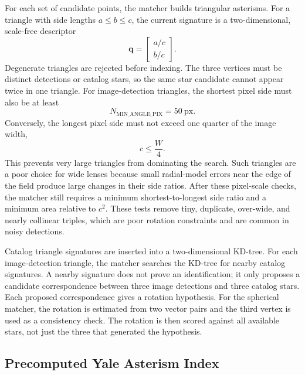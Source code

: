 \documentclass[11pt]{article}
\begin{document}
For each set of candidate points, the matcher builds triangular asterisms. For
a triangle with side lengths \(a\le b\le c\), the current signature is a
two-dimensional, scale-free descriptor
\begin{equation}
  \mathbf{q} =
  \begin{bmatrix}
    a/c\\
    b/c
  \end{bmatrix}.
\end{equation}
Degenerate triangles are rejected before indexing. The three vertices must be
distinct detections or catalog stars, so the same star candidate cannot appear
twice in one triangle. For image-detection triangles, the shortest pixel side
must also be at least
\begin{equation}
  N_{\mathrm{MIN\_ANGLE\_PIX}} = 50 \ \mathrm{px}.
\end{equation}
Conversely, the longest pixel side must not exceed one quarter of the image
width,
\begin{equation}
  c \le \frac{W}{4}.
\end{equation}
This prevents very large triangles from dominating the search. Such triangles
are a poor choice for wide lenses because small radial-model errors near the
edge of the field produce large changes in their side ratios. After these
pixel-scale checks, the matcher still requires a minimum shortest-to-longest
side ratio and a minimum area relative to \(c^2\). These tests remove tiny,
duplicate, over-wide, and nearly collinear triples, which are poor rotation
constraints and are common in noisy detections.

Catalog triangle signatures are inserted into a two-dimensional KD-tree. For
each image-detection triangle, the matcher searches the KD-tree for nearby
catalog signatures. A nearby signature does not prove an identification; it
only proposes a candidate correspondence between three image detections and
three catalog stars. Each proposed correspondence gives a rotation hypothesis.
For the spherical matcher, the rotation is estimated from two vector pairs and
the third vertex is used as a consistency check. The rotation is then scored
against all available stars, not just the three that generated the hypothesis.

\subsection{Precomputed Yale Asterism Index}
\end{document}
